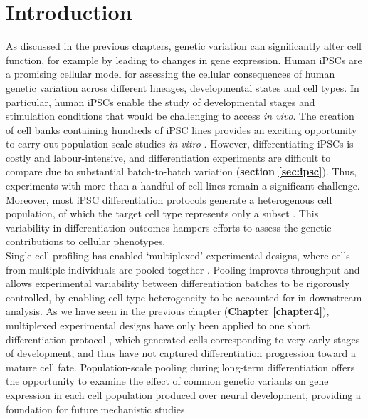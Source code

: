 \newpage

\section{Introduction}
\label{sec:neuroseq_intro}

As discussed in the previous chapters, genetic variation can significantly alter cell function, for example by leading to changes in gene expression. 
Human iPSCs are a promising cellular model for assessing the cellular consequences of human genetic variation across different lineages, developmental states and cell types. 
In particular, human iPSCs enable the study of developmental stages and stimulation conditions that would be challenging to access \textit{in vivo}. 
The creation of cell banks containing hundreds of iPSC lines \cite{kilpinen2017common} provides an exciting opportunity to carry out population-scale studies \textit{in vitro} \cite{cuomo2020single, strober2019dynamic, schwartzentruber2018molecular, alasoo2018shared}.
However, differentiating iPSCs is costly and labour-intensive, and differentiation experiments are difficult to compare due to substantial batch-to-batch variation (\textbf{section \ref{sec:ipsc}}).
Thus, experiments with more than a handful of cell lines remain a significant challenge.
Moreover, most iPSC differentiation protocols generate a heterogenous cell population, of which the target cell type represents only a subset \cite{d2019vitro, banovich2018impact, volpato2018reproducibility, nguyen2018single}. 
This variability in differentiation outcomes hampers efforts to assess the genetic contributions to cellular phenotypes.\\

Single cell profiling has enabled `multiplexed' experimental designs, where cells from multiple individuals are pooled together \cite{cuomo2020single, nguyen2018single}. 
Pooling improves throughput and allows experimental variability between differentiation batches to be rigorously controlled, by enabling cell type heterogeneity to be accounted for in downstream analysis. 
As we have seen in the previous chapter (\textbf{Chapter \ref{chapter4}}), multiplexed experimental designs have only been applied to one short differentiation protocol \cite{cuomo2020single}, which generated cells corresponding to very early stages of development, and thus have not captured differentiation progression toward a mature cell fate. 
Population-scale pooling during long-term differentiation offers the opportunity to examine the effect of common genetic variants on gene expression in each cell population produced over neural development, providing a foundation for future mechanistic studies.\\

